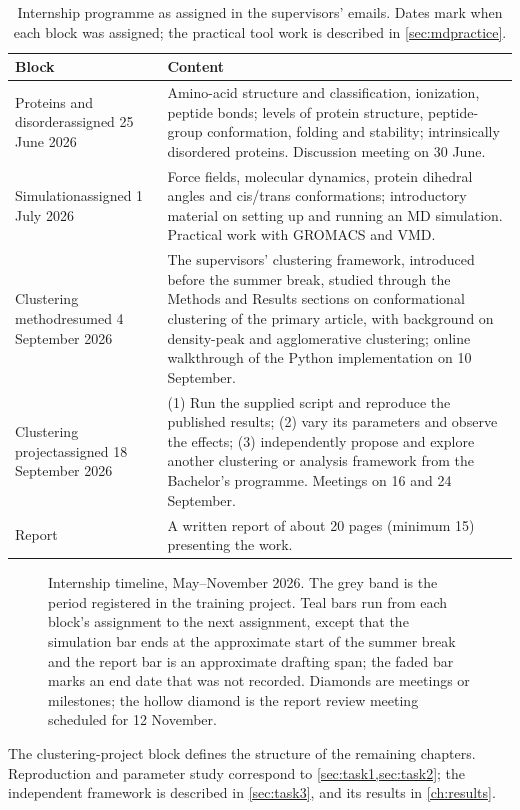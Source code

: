 \begin{table}[htbp]
\centering
\caption{Internship programme as assigned in the supervisors' emails. Dates mark when each block was assigned; the practical tool work is described in \cref{sec:mdpractice}.}
\label{tab:programme}
\begin{tabularx}{\textwidth}{@{}>{\raggedright\arraybackslash}p{}>{\raggedright\arraybackslash}X@{}}
\toprule
Block & Content\\
\midrule
Proteins and disorder\newline\footnotesize assigned 25 June 2026
& Amino-acid structure and classification, ionization, peptide bonds; levels of protein structure, peptide-group conformation, folding and stability; intrinsically disordered proteins. Discussion meeting on 30 June.\\
\addlinespace
Simulation\newline\footnotesize assigned 1 July 2026
& Force fields, molecular dynamics, protein dihedral angles and cis/trans conformations; introductory material on setting up and running an MD simulation. Practical work with GROMACS and VMD.\\
\addlinespace
Clustering method\newline\footnotesize resumed 4 September 2026
& The supervisors' clustering framework, introduced before the summer break, studied through the Methods and Results sections on conformational clustering of the primary article, with background on density-peak and agglomerative clustering; online walkthrough of the Python implementation on 10 September.\\
\addlinespace
Clustering project\newline\footnotesize assigned 18 September 2026
& (1) Run the supplied script and reproduce the published results; (2) vary its parameters and observe the effects; (3) independently propose and explore another clustering or analysis framework from the Bachelor's programme. Meetings on 16 and 24 September.\\
\addlinespace
Report
& A written report of about 20 pages (minimum 15) presenting the work.\\
\bottomrule
\end{tabularx}
\end{table}

\begin{figure}[htbp]
\centering
\caption{Internship timeline, May--November 2026. The grey band is the period registered in the training project. Teal bars run from each block's assignment to the next assignment, except that the simulation bar ends at the approximate start of the summer break and the report bar is an approximate drafting span; the faded bar marks an end date that was not recorded. Diamonds are meetings or milestones; the hollow diamond is the report review meeting scheduled for 12 November.}
\label{fig:timeline}
\end{figure}

The clustering-project block defines the structure of the remaining chapters. Reproduction and parameter study correspond to \cref{sec:task1,sec:task2}; the independent framework is described in \cref{sec:task3}, and its results in \cref{ch:results}.
